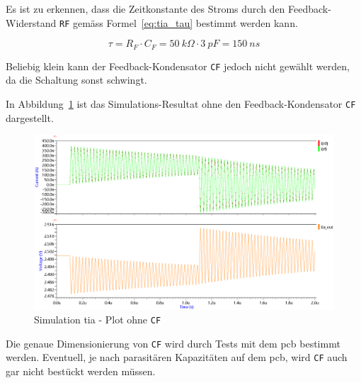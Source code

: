 Es ist zu erkennen, dass die Zeitkonstante des Stroms durch den Feedback-Widerstand \lstinline|RF| gemäss
Formel~\ref{eq:tia_tau} bestimmt werden kann.

\begin{equation}\label{eq:tia_tau}
    \tau = R_F \cdot C_F = 50~k\Omega \cdot 3~pF = 150~ns
\end{equation}

Beliebig klein kann der Feedback-Kondensator \lstinline|CF| jedoch nicht gewählt werden, da die Schaltung sonst schwingt.

In Abbildung~\ref{fig:simulation_tia_plot_wo_cf} ist das Simulations-Resultat ohne den Feedback-Kondensator
\lstinline|CF| dargestellt.

\begin{figure}[H]
    \centering
    \includegraphics[width=\textwidth]{graphics/simulation_tia_plot_wo_cf.png}
    \caption{Simulation \acrshort{tia} - Plot ohne \lstinline|CF|}\label{fig:simulation_tia_plot_wo_cf}
\end{figure}

Die genaue Dimensionierung von \lstinline|CF| wird durch Tests mit dem \acrshort{pcb} bestimmt werden. Eventuell, je
nach parasitären Kapazitäten auf dem \acrshort{pcb}, wird \lstinline|CF| auch gar nicht bestückt werden müssen.
